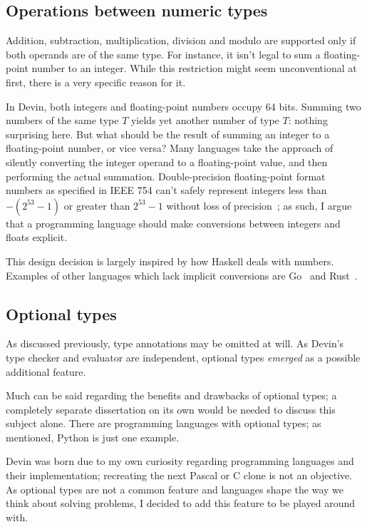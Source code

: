 \documentclass[UdineBachThesis,american,11pt]{PhdThesis}
\begin{document}
  \subsection{Operations between numeric types}

  Addition, subtraction, multiplication, division and modulo are supported only
  if both operands are of the same type. For instance, it isn't legal to sum a
  floating-point number to an integer. While this restriction might seem
  unconventional at first, there is a very specific reason for it.

  In Devin, both integers and floating-point numbers occupy 64 bits. Summing two
  numbers of the same type $T$ yields yet another number of type $T$: nothing
  surprising here. But what should be the result of summing an integer to a
  floating-point number, or vice versa? Many languages take the approach of
  silently converting the integer operand to a floating-point value, and then
  performing the actual summation. Double-precision floating-point format
  numbers as specified in IEEE 754 can't safely represent integers less than
  $-\left(2^{53} - 1\right)$ or greater than $2^{53} - 1$ without loss of
  precision~\cite{mdn-is-safe-integer}; as such, I argue that a programming
  language should make conversions between integers and floats explicit.

  This design decision is largely inspired by how Haskell deals with numbers.
  Examples of other languages which lack implicit conversions are
  Go~\cite{go-numeric-types} and Rust~\cite{rust-conversion}.

  \subsection{Optional types}

  As discussed previously, type annotations may be omitted at will. As Devin's
  type checker and evaluator are independent, optional types \emph{emerged} as a
  possible additional feature.

  Much can be said regarding the benefits and drawbacks of optional types; a
  completely separate dissertation on its own would be needed to discuss this
  subject alone. There are programming languages with optional types; as
  mentioned, Python is just one example.

  Devin was born due to my own curiosity regarding programming languages and
  their implementation; recreating the next Pascal or C clone is not an
  objective. As optional types are not a common feature and languages shape the
  way we think about solving problems, I decided to add this feature to be
  played around with.
\end{document}
